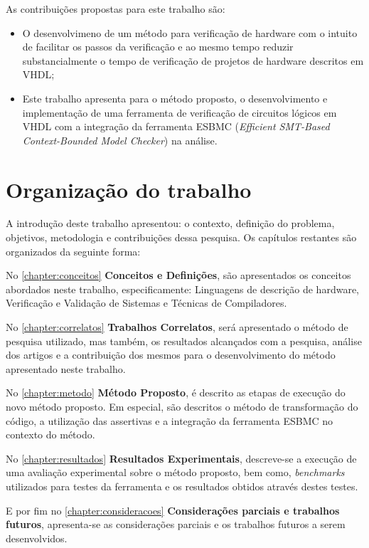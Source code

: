 As contribuições propostas para este trabalho são:
\begin{itemize}
  \item O desenvolvimeno de um método para verificação de hardware com o intuito de facilitar os passos da verificação e ao mesmo tempo reduzir substancialmente o tempo de verificação de projetos de hardware descritos em VHDL;
  \item Este trabalho apresenta para o método proposto, o desenvolvimento e implementação de uma ferramenta de verificação de circuitos lógicos em VHDL com a integração da ferramenta ESBMC (\textit{Efficient SMT-Based Context-Bounded Model Checker})\cite{cordeiro2012smt} na análise.
\end{itemize}


\section{Organização do trabalho}
A introdução deste trabalho apresentou: o contexto, definição do problema, objetivos, metodologia e contribuições dessa pesquisa. Os capítulos restantes são organizados da seguinte forma:

\par
No \autoref{chapter:conceitos} \textbf{Conceitos e Definições}, são apresentados os conceitos abordados neste trabalho, especificamente: Linguagens de descrição de hardware, Verificação e Validação de Sistemas e Técnicas de Compiladores.

\par
No \autoref{chapter:correlatos} \textbf{Trabalhos Correlatos}, será apresentado o método de pesquisa utilizado, mas também, os resultados alcançados com a pesquisa, análise dos artigos e a contribuição dos mesmos para o desenvolvimento do método apresentado neste trabalho.

\par
No \autoref{chapter:metodo} \textbf{Método Proposto}, é descrito as etapas de execução do novo método proposto. Em especial, são descritos o método de transformação do código, a utilização das assertivas e a integração da ferramenta ESBMC no contexto do método.

\par
No \autoref{chapter:resultados} \textbf{Resultados Experimentais}, descreve-se a execução de uma avaliação experimental sobre o método proposto, bem como, 
\textit{benchmarks} utilizados para testes da ferramenta e os resultados obtidos através destes testes.
\par
E por fim no \autoref{chapter:consideracoes} \textbf{Considerações parciais e trabalhos futuros}, apresenta-se as considerações parciais e os trabalhos futuros a serem desenvolvidos. 

